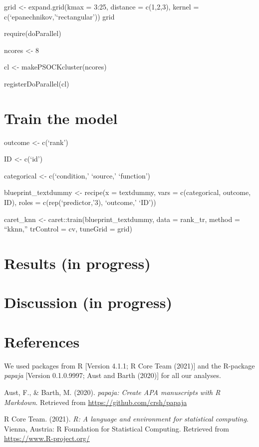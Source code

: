 \documentclass[
  english,
  man]{apa6}
\newlength{\cslhangindent}
\newlength{\cslentryspacingunit} %
\newenvironment{CSLReferences}[2] %
 {%
  \setlength{\parindent}{0pt}
  \ifodd #1
  \let\oldpar\par
  \def\par{\hangindent=\cslhangindent\oldpar}
  \fi
  \setlength{\parskip}{#2\cslentryspacingunit}
 }%
 {}
\begin{document}
grid \textless- expand.grid(kmax = 3:25,
distance = c(1,2,3),
kernel = c(`epanechnikov,'`rectangular'))
grid

require(doParallel)

ncores \textless- 8

cl \textless- makePSOCKcluster(ncores)

registerDoParallel(cl)

\hypertarget{train-the-model}{%
\section{Train the model}\label{train-the-model}}

outcome \textless- c(`rank')

ID \textless- c(`id')

categorical \textless- c(`condition,' `source,' `function')

blueprint\_textdummy \textless- recipe(x = textdummy,
vars = c(categorical, outcome, ID),
roles = c(rep(`predictor,'3), `outcome,' `ID'))

caret\_knn \textless- caret::train(blueprint\_textdummy,
data = rank\_tr,
method = ``kknn,''
trControl = cv,
tuneGrid = grid)

\hypertarget{results-in-progress}{%
\section{Results (in progress)}\label{results-in-progress}}

\hypertarget{discussion-in-progress}{%
\section{Discussion (in progress)}\label{discussion-in-progress}}

\newpage

\hypertarget{references}{%
\section{References}\label{references}}

We used packages from R {[}Version 4.1.1; R Core Team (2021){]} and the R-package \emph{papaja} {[}Version 0.1.0.9997; Aust and Barth (2020){]} for all our analyses.

\begingroup
\setlength{\parindent}{-0.5in}
\setlength{\leftskip}{0.5in}

\hypertarget{refs}{}
\begin{CSLReferences}{1}{0}
\leavevmode{}%
Aust, F., \& Barth, M. (2020). \emph{{papaja}: {Create} {APA} manuscripts with {R Markdown}}. Retrieved from \url{https://github.com/crsh/papaja}

\leavevmode{}%
R Core Team. (2021). \emph{R: A language and environment for statistical computing}. Vienna, Austria: R Foundation for Statistical Computing. Retrieved from \url{https://www.R-project.org/}

\end{CSLReferences}

\endgroup
\end{document}
